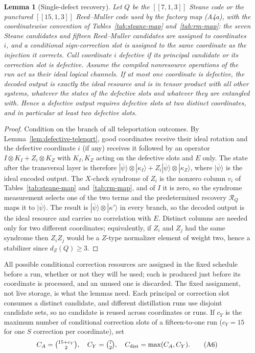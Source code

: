 \documentclass[aps,prx,reprint,superscriptaddress,nofootinbib,floatfix,longbibliography]{revtex4-2}
\newtheorem{lemma}[theorem]{Lemma}
\theoremstyle{definition}
\begin{document}
\begin{lemma}[Single-defect recovery]\label{lem:A5}
Let $Q$ be the $[[7,1,3]]$ Steane code or the punctured $[[15,1,3]]$
Reed--Muller code used by the factory map (A4a), with the coordinatewise
convention of Tables~\ref{tab:steane-map} and~\ref{tab:rm-map}: the seven
Steane candidates and fifteen Reed--Muller candidates are assigned to
coordinates $i$, and a conditional sign-correction slot is assigned to the
same coordinate as the injection it corrects.  Call coordinate $i$ defective
if its principal candidate or its correction slot is defective.  Assume the
compiled nonresource operations of the run act as their ideal logical
channels.  If at most one coordinate is defective, the decoded output is
exactly the ideal resource and is in tensor product with all other systems,
whatever the states of the defective slots and whatever they are entangled
with.  Hence a defective output requires defective slots at two distinct
coordinates, and in particular at least two defective slots.
\end{lemma}
\begin{proof}
Condition on the branch of all teleportation outcomes.  By
Lemma~\ref{lem:defective-teleport}, good coordinates receive their ideal
rotation and the defective coordinate $i$ (if any) receives it followed by an
operator $I\otimes K_I+Z_i\otimes K_Z$ with $K_I,K_Z$ acting on the defective
slots and $E$ only.  The state after the transversal layer is therefore
$|\overline\psi\rangle\otimes|\kappa_I\rangle+Z_i|\overline\psi\rangle\otimes
|\kappa_Z\rangle$, where $|\overline\psi\rangle$ is the ideal encoded output.
The $X$-check syndrome of $Z_i$ is the nonzero column $v_i$ of
Tables~\ref{tab:steane-map} and~\ref{tab:rm-map}, and of $I$ it is zero, so
the syndrome measurement selects one of the two terms and the predetermined
recovery $\mathcal R_Q$ maps it to $|\overline\psi\rangle$.  The result is
$|\overline\psi\rangle\otimes|\kappa'\rangle$ in every branch, so the decoded
output is the ideal resource and carries no correlation with $E$.  Distinct
columns are needed only for two different coordinates; equivalently, if
$Z_i$ and $Z_j$ had the same syndrome then $Z_iZ_j$ would be a $Z$-type
normalizer element of weight two, hence a stabilizer since $d_Z(Q)\ge3$.
\end{proof}

All possible conditional correction resources are assigned in the fixed
schedule before a run, whether or not they will be used; each is produced
just before its coordinate is processed, and an unused one is discarded.  The
fixed assignment, not live storage, is what the lemmas need.  Each principal
or correction slot consumes a distinct candidate, and different distillation
runs use disjoint candidate sets, so no candidate is reused across
coordinates or runs.  If $c_Y$ is the
maximum number of conditional correction slots of a fifteen-to-one run
($c_Y=15$ for one $S$ correction per coordinate), set
\begin{equation}
 C_A=\tbinom{15+c_Y}{2},\quad C_Y=\tbinom{7}{2},\quad
 C_{\rm dist}=\max(C_A,C_Y).                                     \tag{A6}
\end{equation}
\end{document}
